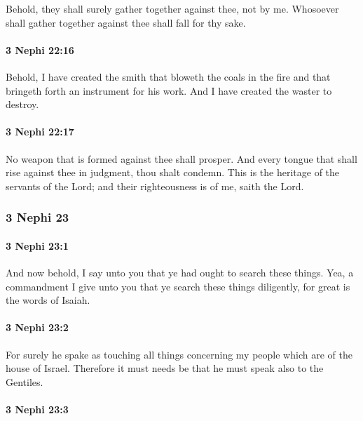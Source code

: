 			Behold, they shall surely gather together against thee, not by me.
			Whosoever shall gather together against thee shall fall for thy sake.

		\paragraph{3 Nephi 22:16} %
			\label{3NEPHI-22-16}

			Behold, I have created the smith that bloweth the coals in the fire
			and that bringeth forth an instrument for his work.
			And I have created the waster to destroy.

		\paragraph{3 Nephi 22:17} %
			\label{3NEPHI-22-17}

			No weapon that is formed against thee shall prosper.
			And every tongue that shall rise against thee in judgment,
			thou shalt condemn.
			This is the heritage of the servants of the Lord;
			and their righteousness is of me, saith the Lord.

	\subsubsection{3 Nephi 23} %
		\label{3NEPHI-23}
		
		\paragraph{3 Nephi 23:1} %
			\label{3NEPHI-23-1}

			And now behold, I say unto you
			that ye had ought to search these things.
			Yea, a commandment I give unto you
			that ye search these things diligently,
			for great is the words of Isaiah.

		\paragraph{3 Nephi 23:2} %
			\label{3NEPHI-23-2}

			For surely he spake as touching all things
			concerning my people which are of the house of Israel.
			Therefore it must needs be that he must speak also to the Gentiles.

		\paragraph{3 Nephi 23:3} %
			\label{3NEPHI-23-3}

